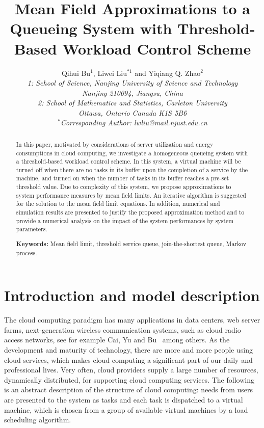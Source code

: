 \documentclass[12pt]{article}
\begin{document}
\title{\bf Mean Field Approximations to a Queueing System with Threshold-Based Workload Control Scheme}
\author{Qihui Bu$^{1}$, Liwei Liu$^{*1}$ and Yiqiang Q. Zhao$^{2}$\\
{\em\small 1: School of Science, Nanjing University of Science and Technology}\\
{\em\small Nanjing 210094, Jiangsu, China}\\
{\em\small 2: School of Mathematics and Statistics, Carleton University}\\
{\em\small Ottawa, Ontario Canada  K1S 5B6}\\
{\em\small\em $^{*}$Corresponding Author: lwliu@mail.njust.edu.cn}}
\date{}
\maketitle

\renewcommand{\baselinestretch}{1.3}
\large\normalsize
\begin{abstract}
  In this paper, motivated by considerations of server utilization and energy consumptions in cloud computing, we investigate a homogeneous queueing system with a threshold-based workload control scheme. In this system, a virtual machine will be turned off when there are no tasks in its buffer upon the completion of a service by the machine,  and turned on when the number of tasks in its buffer reaches a pre-set threshold value. Due to complexity of this system, we propose approximations to system performance measures by mean field limits. An iterative algorithm is suggested for the solution to the mean field limit equations. In addition, numerical and simulation results are presented to justify the proposed approximation method and to provide a numerical analysis on the impact of the system performances by system parameters.
\par
{\bf Keywords:} Mean field limit, threshold service queue, join-the-shortest queue, Markov process.
\end{abstract}
\section{Introduction and model description}
The cloud computing paradigm has many applications in data centers, web server farms, next-generation wireless communication systems, such as cloud radio access networks, see for example Cai, Yu and Bu~\cite{CY} among others. As the development and maturity of technology, there are more and more people using cloud services, which makes cloud computing a significant part of our daily and professional lives. Very often, cloud providers supply a large number of resources, dynamically distributed, for supporting cloud computing services. The following is an abstract description of the structure of cloud computing: needs from users are presented to the system as tasks and each task is dispatched to a virtual machine, which is chosen from a group of available virtual machines by a load scheduling algorithm.
\end{document}
